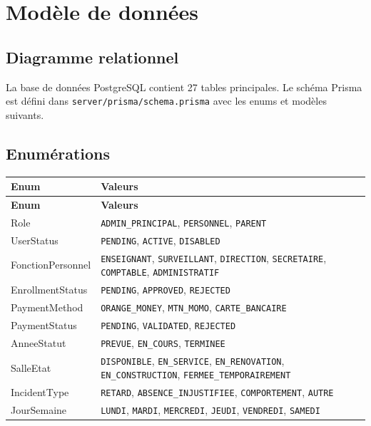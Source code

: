 \documentclass[12pt,a4paper]{report}
\begin{document}
\chapter{Modèle de données}
 
\section{Diagramme relationnel}
La base de données PostgreSQL contient 27 tables principales. Le schéma Prisma est défini dans \texttt{server/prisma/schema.prisma} avec les enums et modèles suivants.

\section{Enumérations}
\begin{longtable}{|p{3.5cm}|p{10.5cm}|}
\hline
\textbf{Enum} & \textbf{Valeurs} \\
\hline
\endfirsthead
\hline
\textbf{Enum} & \textbf{Valeurs} \\
\hline
\endhead
Role & \texttt{ADMIN\_PRINCIPAL}, \texttt{PERSONNEL}, \texttt{PARENT} \\
\hline
UserStatus & \texttt{PENDING}, \texttt{ACTIVE}, \texttt{DISABLED} \\
\hline
FonctionPersonnel & \texttt{ENSEIGNANT}, \texttt{SURVEILLANT}, \texttt{DIRECTION}, \texttt{SECRETAIRE}, \texttt{COMPTABLE}, \texttt{ADMINISTRATIF} \\
\hline
EnrollmentStatus & \texttt{PENDING}, \texttt{APPROVED}, \texttt{REJECTED} \\
\hline
PaymentMethod & \texttt{ORANGE\_MONEY}, \texttt{MTN\_MOMO}, \texttt{CARTE\_BANCAIRE} \\
\hline
PaymentStatus & \texttt{PENDING}, \texttt{VALIDATED}, \texttt{REJECTED} \\
\hline
AnneeStatut & \texttt{PREVUE}, \texttt{EN\_COURS}, \texttt{TERMINEE} \\
\hline
SalleEtat & \texttt{DISPONIBLE}, \texttt{EN\_SERVICE}, \texttt{EN\_RENOVATION}, \texttt{EN\_CONSTRUCTION}, \texttt{FERMEE\_TEMPORAIREMENT} \\
\hline
IncidentType & \texttt{RETARD}, \texttt{ABSENCE\_INJUSTIFIEE}, \texttt{COMPORTEMENT}, \texttt{AUTRE} \\
\hline
JourSemaine & \texttt{LUNDI}, \texttt{MARDI}, \texttt{MERCREDI}, \texttt{JEUDI}, \texttt{VENDREDI}, \texttt{SAMEDI} \\
\hline
\end{longtable}
\end{document}
